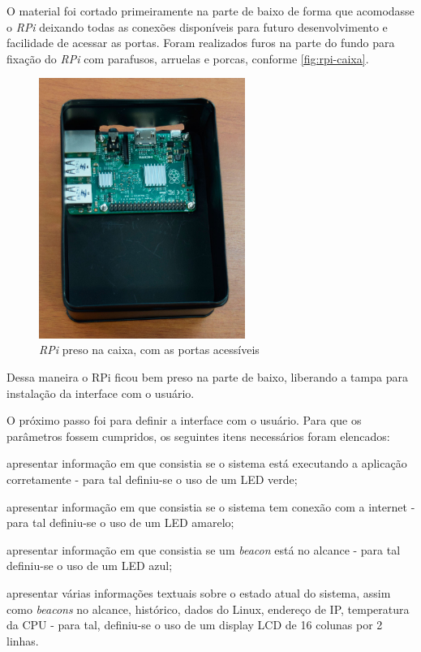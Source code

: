 O material foi cortado primeiramente na parte de baixo de forma que acomodasse o \textit{RPi} deixando todas as conexões disponíveis para futuro desenvolvimento e facilidade de acessar as portas. Foram realizados furos na parte do fundo para fixação do \textit{RPi} com parafusos, arruelas e porcas, conforme \autoref{fig:rpi-caixa}.


\begin{figure}[htb]
	\caption{\label{fig:rpi-caixa}\textit{RPi} preso na caixa, com as portas acessíveis}
	\begin{center}
		\includegraphics[width=0.6\textwidth]{img/rpi-caixa.jpg}
	\end{center}
\end{figure}

Dessa maneira o RPi ficou bem preso na parte de baixo, liberando a tampa para instalação da interface com o usuário.

O próximo passo foi para definir a interface com o usuário. Para que os parâmetros fossem cumpridos, os seguintes itens necessários foram elencados:

\begin{alineas}
	\item apresentar informação em que consistia se o sistema está executando a aplicação corretamente - para tal definiu-se o uso de um LED verde;
	\item apresentar informação em que consistia se o sistema tem conexão com a internet - para tal definiu-se o uso de um LED amarelo;
	\item apresentar informação em que consistia se um \textit{beacon} está no alcance - para tal definiu-se o uso de um LED azul;
	\item apresentar várias informações textuais sobre o estado atual do sistema, assim como \textit{beacons} no alcance, histórico, dados do Linux, endereço de IP, temperatura da CPU - para tal, definiu-se o uso de um display LCD de 16 colunas por 2 linhas.
\end{alineas}

